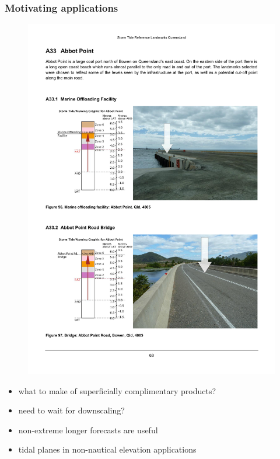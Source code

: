 \begin{frame}
\frametitle{Motivating applications}
\begin{minipage}{0.45\textwidth}
    \begin{figure}      
    \includegraphics[height=\textheight]{figures/images/qldLandmarkEg.pdf}
    \end{figure}
\end{minipage}
\hfill
\begin{minipage}{0.45\textwidth}
  \begin{itemize}
      \item what to make of superficially complimentary products?
      \item need to wait for downscaling?
      \item non-extreme longer forecasts are useful
      \item tidal planes in non-nautical elevation applications 
  \end{itemize}
\end{minipage}
\end{frame}

